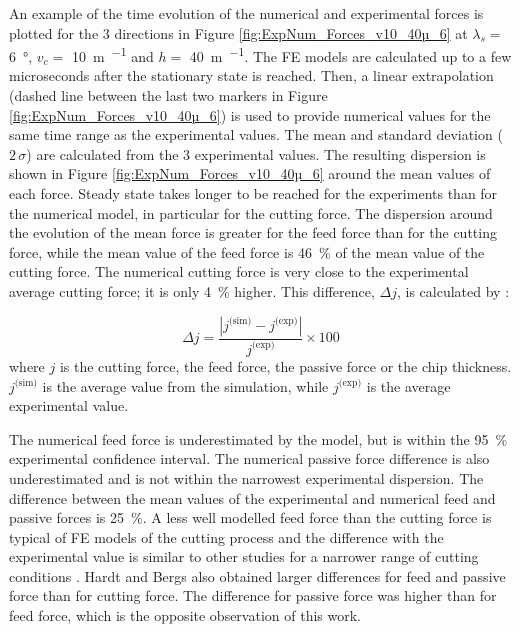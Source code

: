 \documentclass[preprint,12pt,times]{elsarticle}
\begin{document}
An example of the time evolution of the numerical and experimental forces is plotted for the 3 directions in Figure \ref{fig:ExpNum_Forces_v10_40µ_6} at $\lambda_s =$ \qty{6}{\degree}, $v_c =$ \qty{10}{\m\per\min} and $h =$ \qty{40}{\m\per\min}. The FE models are calculated up to a few microseconds after the stationary state is reached. Then, a linear extrapolation (dashed line between the last two markers in Figure \ref{fig:ExpNum_Forces_v10_40µ_6}) is used to provide numerical values for the same time range as the experimental values. The mean and standard deviation ($2\,\sigma$) are calculated from the 3 experimental values. The resulting dispersion is shown in Figure \ref{fig:ExpNum_Forces_v10_40µ_6} around the mean values of each force. Steady state takes longer to be reached for the experiments than for the numerical model, in particular for the cutting force. The dispersion around the evolution of the mean force is greater for the feed force than for the cutting force, while the mean value of the feed force is \qty{46}{\%} of the mean value of the cutting force. The numerical cutting force is very close to the experimental average cutting force; it is only \qty{4}{\%} higher. This difference, $\Delta j$, is calculated by :

%
\begin{equation}\label{eq:diff}
\Delta j = \frac{\left|j^\text{(sim)} - j^\text{(exp)}\right|}{j^\text{(exp)}}\times 100
\end{equation}
%
where $j$ is the cutting force, the feed force, the passive force or the chip thickness. $j^\text{(sim)}$ is the average value from the simulation, while $j^\text{(exp)}$ is the average experimental value.

The numerical feed force is underestimated by the model, but is within the \qty{95}{\%} experimental confidence interval. The numerical passive force difference is also underestimated and is not within the narrowest experimental dispersion. The difference between the mean values of the experimental and numerical feed and passive forces is \qty{25}{\%}. A less well modelled feed force than the cutting force is typical of FE models of the cutting process and the difference with the experimental value is similar to other studies for a narrower range of cutting conditions \cite{sima_Modified_2010, ducobu_Material_2016, karpat_Temperature_2011, zhang_Chip_2011,afrasiabi_NumericalExperimental_2021}. Hardt and Bergs \cite{hardt_Three_2021} also obtained larger differences for feed and passive force than for cutting force. The difference for passive force was higher than for feed force, which is the opposite observation of this work.
\end{document}
